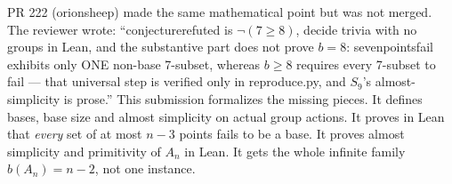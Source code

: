 \documentclass[11pt]{article}
\theoremstyle{definition}
\theoremstyle{remark}
\renewcommand{\_}{\oldus\allowbreak}
\begin{document}
PR 222 (orionsheep) made the same mathematical point but was not merged. The reviewer wrote:
``conjecture\_refuted is $\neg(7\ge8)$, decide trivia with no groups in Lean, and the substantive
part does not prove $b=8$: seven\_points\_fail exhibits only ONE non-base 7-subset, whereas
$b\ge8$ requires every 7-subset to fail --- that universal step is verified only in
reproduce.py, and $S_9$'s almost-simplicity is prose.'' This submission formalizes the missing
pieces. It defines bases, base size and almost simplicity on actual group actions. It proves in
Lean that \emph{every} set of at most $n-3$ points fails to be a base. It proves almost simplicity
and primitivity of $A_n$ in Lean. It gets the whole infinite family $b(A_n)=n-2$, not one
instance.
\end{document}
